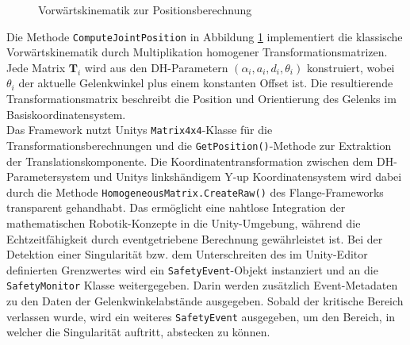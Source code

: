 \begin{figure}[H]
	\inputminted[fontsize=\footnotesize]{csharp}{code-snippets/CalculateJointPos.cs}
	\caption{Vorwärtskinematik zur Positionsberechnung}
	\label{listing:forwardKinematic}
\end{figure}

\noindent
Die Methode \texttt{ComputeJointPosition} in Abbildung \ref{listing:forwardKinematic} implementiert die klassische Vorwärtskinematik durch
Multiplikation homogener Transformationsmatrizen. Jede Matrix $\mathbf{T}_i$
wird aus den DH-Parametern $(\alpha_i, a_i, d_i, \theta_i)$ konstruiert, wobei
$\theta_i$ der aktuelle Gelenkwinkel plus einem konstanten Offset ist. Die
resultierende Transformationsmatrix beschreibt die Position und Orientierung des
Gelenks im Basiskoordinatensystem.\\

\noindent
Das Framework nutzt Unitys \texttt{Matrix4x4}-Klasse für die
Transformationsberechnungen und die \texttt{GetPosition()}-Methode zur
Extraktion der Translationskomponente. Die Koordinatentransformation zwischen
dem DH-Parametersystem und Unitys linkshändigem Y-up Koordinatensystem wird
dabei durch die Methode \texttt{HomogeneousMatrix.CreateRaw()} des
Flange-Frameworks transparent gehandhabt. Das ermöglicht eine nahtlose
Integration der mathematischen Robotik-Konzepte in die Unity-Umgebung, während
die Echtzeitfähigkeit durch eventgetriebene Berechnung gewährleistet ist.
Bei der Detektion einer Singularität bzw. dem Unterschreiten des im Unity-Editor
definierten Grenzwertes wird ein \texttt{SafetyEvent}-Objekt instanziert und an die
\texttt{SafetyMonitor} Klasse weitergegeben. Darin werden zusätzlich Event-Metadaten zu den
Daten der Gelenkwinkelabstände ausgegeben. Sobald der
kritische Bereich verlassen wurde, wird ein weiteres \texttt{SafetyEvent} ausgegeben, um
den Bereich, in welcher die Singularität auftritt, abstecken zu können.
